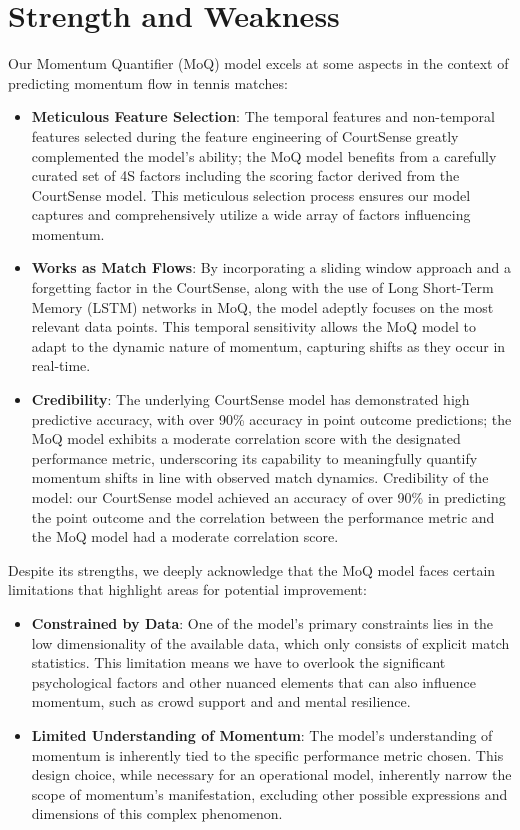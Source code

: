 \documentclass[12pt]{article}  %
\begin{document}
\section{Strength and Weakness}
Our Momentum Quantifier (MoQ) model excels at some aspects in the context of predicting momentum flow in tennis matches:

\begin{itemize}
	\item \textbf{Meticulous Feature Selection}: The temporal features and non-temporal features selected during the feature engineering of CourtSense greatly complemented the model's ability; the MoQ model benefits from a carefully curated set of 4S factors including the scoring factor derived from the CourtSense model. This meticulous selection process ensures our model captures and comprehensively utilize a wide array of factors influencing momentum.
	\item \textbf{Works as Match Flows}: By incorporating a sliding window approach and a forgetting factor in the CourtSense, along with the use of Long Short-Term Memory (LSTM) networks in MoQ, the model adeptly focuses on the most relevant data points. This temporal sensitivity allows the MoQ model to adapt to the dynamic nature of momentum, capturing shifts as they occur in real-time.
	\item \textbf{Credibility}: The underlying CourtSense model has demonstrated high predictive accuracy, with over 90\% accuracy in point outcome predictions; the MoQ model exhibits a moderate correlation score with the designated performance metric, underscoring its capability to meaningfully quantify momentum shifts in line with observed match dynamics. Credibility of the model: our CourtSense model achieved an accuracy of over 90\% in predicting the point outcome and the correlation between the performance metric and the MoQ model had a moderate correlation score.
\end{itemize}

Despite its strengths, we deeply acknowledge that the MoQ model faces certain limitations that highlight areas for potential improvement:
\begin{itemize}
	\item \textbf{Constrained by Data}: One of the model's primary constraints lies in the low dimensionality of the available data, which only consists of explicit match statistics. This limitation means we have to overlook the significant psychological factors and other nuanced elements that can also influence momentum, such as crowd support and and mental resilience.
	\item \textbf{Limited Understanding of Momentum}: The model's understanding of momentum is inherently tied to the specific performance metric chosen. This design choice, while necessary for an operational model, inherently narrow the scope of momentum's manifestation, excluding other possible expressions and dimensions of this complex phenomenon.
\end{itemize}
\end{document}
